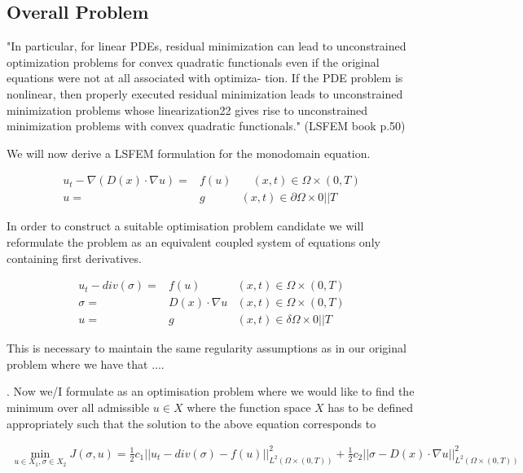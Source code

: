 \documentclass[fleqn, a4paper, 11pt, bibliography=totoc]{report}
\begin{document}
\subsection{Overall Problem}

"In particular, for linear PDEs, residual minimization can lead to unconstrained optimization problems for convex quadratic functionals even if the original equations were not at all associated with optimiza- tion. If the PDE problem is nonlinear, then properly executed residual minimization leads to unconstrained minimization problems whose linearization22 gives rise to unconstrained minimization problems with convex quadratic functionals." (LSFEM book p.50)

We will now derive a LSFEM formulation for the monodomain equation. 

\begin{equation}
\begin{aligned}
u_t - \nabla(D(x) \cdot \nabla u)  =& f(u) &\quad (x,t) \in \Omega \times (0,T) \\
u =& g \quad &(x,t) \in \partial \Omega \times 0 || T 
\end{aligned}
\end{equation}

In order to construct a suitable optimisation problem candidate we will reformulate the problem as an equivalent coupled system of equations only containing first derivatives. 

\begin{equation}
\begin{aligned}
u_t - div(\sigma) =& f(u)  & (x,t) \in \Omega \times (0,T) \\
\sigma =& D(x) \cdot \nabla u & (x,t) \in \Omega \times (0,T)  \\
u =& g  &(x,t) \in \delta \Omega \times 0 || T 
\end{aligned}
\end{equation}

This is necessary to maintain the same regularity assumptions as in our original problem where we have that ....

. Now we/I
formulate as an optimisation problem where we would like to find the minimum over all admissible $u \in X$ where the function space $ X$ has to be defined appropriately such that the solution to the above equation corresponds to 

\begin{align}
\min_{u \in X_1, \sigma \in X_2} J(\sigma, u) = \frac{1}{2} c_1 || u_t - div(\sigma) - f(u) ||_{L^2(\Omega \times (0,T))}^2 + \frac{1}{2} c_2 || \sigma - D(x) \cdot \nabla u || _{L^2(\Omega \times (0,T))}^2
\end{align}
\end{document}
